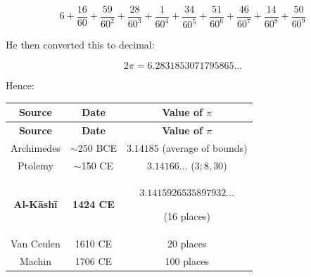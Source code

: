 \documentclass[11pt,a4paper]{article}
\begin{document}
\[

6 + \frac{16}{60} + \frac{59}{60^2} + \frac{28}{60^3} + \frac{1}{60^4} +

\frac{34}{60^5} + \frac{51}{60^6} + \frac{46}{60^7} + \frac{14}{60^8} +

\frac{50}{60^9}

\]



\noindent He then converted this to decimal:

\[

2\pi = 6.2831853071795865\ldots

\]



\noindent Hence:

\begin{center}

\fbox{$\pi = 3.1415926535897932\ldots$}

\end{center}



\begin{longtable}{|c|c|c|}

\hline

\textbf{Source} & \textbf{Date} & \textbf{Value of $\pi$} \\

\hline

\endfirsthead

\hline

\textbf{Source} & \textbf{Date} & \textbf{Value of $\pi$} \\

\hline

\endhead

Archimedes & $\sim$250 BCE & $3.14185$ (average of bounds) \\

\hline

Ptolemy & $\sim$150 CE & $3.14166\ldots$ ($3; 8, 30$) \\

\hline

\textbf{Al-K\=ash\=i} & \textbf{1424 CE} & $\mathbf{3.1415926535897932\ldots}$

(16 places) \\

\hline

Van Ceulen & 1610 CE & 20 places \\

\hline

Machin & 1706 CE & 100 places \\

\hline

\end{longtable}
\end{document}
